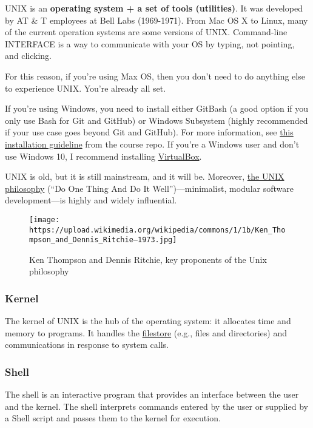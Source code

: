 \documentclass[
]{book}
\begin{document}
UNIX is an \textbf{operating system + a set of tools (utilities)}. It was developed by AT \& T employees at Bell Labs (1969-1971). From Mac OS X to Linux, many of the current operation systems are some versions of UNIX. Command-line INTERFACE is a way to communicate with your OS by typing, not pointing, and clicking.

For this reason, if you're using Max OS, then you don't need to do anything else to experience UNIX. You're already all set.

If you're using Windows, you need to install either GitBash (a good option if you only use Bash for Git and GitHub) or Windows Subsystem (highly recommended if your use case goes beyond Git and GitHub). For more information, see \href{https://GitHub.com/PS239T/spring_2021/blob/main/B_Install.md}{this installation guideline} from the course repo. If you're a Windows user and don't use Windows 10, I recommend installing \href{https://www.virtualbox.org/}{VirtualBox}.

UNIX is old, but it is still mainstream, and it will be. Moreover, \href{https://en.wikipedia.org/wiki/Unix_philosophy}{the UNIX philosophy} (``Do One Thing And Do It Well'')---minimalist, modular software development---is highly and widely influential.

\begin{figure}
\centering
\texttt{[image: https://upload.wikimedia.org/wikipedia/commons/1/1b/Ken\_Thompson\_and\_Dennis\_Ritchie--1973.jpg]}
\caption{Ken Thompson and Dennis Ritchie, key proponents of the Unix philosophy}
\end{figure}

\hypertarget{kernel}{%
\subsubsection{Kernel}\label{kernel}}

The kernel of UNIX is the hub of the operating system: it allocates time and memory to programs. It handles the \href{http://users.ox.ac.uk/~martinw/unix/chap3.html}{filestore} (e.g., files and directories) and communications in response to system calls.

\hypertarget{shell}{%
\subsubsection{Shell}\label{shell}}

The shell is an interactive program that provides an interface between the user and the kernel. The shell interprets commands entered by the user or supplied by a Shell script and passes them to the kernel for execution.
\end{document}
